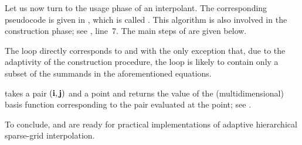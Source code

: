 
Let us now turn to the usage phase of an interpolant. The corresponding
pseudocode is given in , which is called . This
algorithm is also involved in the construction phase; see ,
line~7. The main steps of  are given below.

\begin{compactlist}

 The loop directly corresponds to  and
 with the only exception that, due to the adaptivity of
the construction procedure, the loop is likely to contain only a subset of the
summands in the aforementioned equations.

  takes a pair $(\mathbf{i}, \mathbf{j})$ and a point and
returns the value of the (multidimensional) basis function corresponding to the
pair evaluated at the point; see .

\end{compactlist}

To conclude,  and  are ready for practical
implementations of adaptive hierarchical sparse-grid interpolation.
